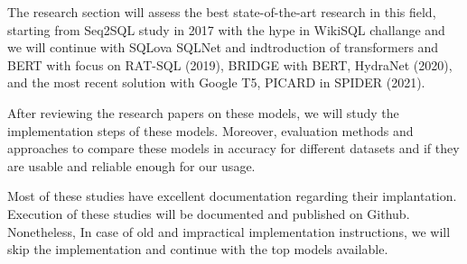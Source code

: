 The research section will assess the best state-of-the-art research in this field, starting from Seq2SQL\cite{zhong_seq2sql_2017} study in 2017 with the hype in WikiSQL challange and we will continue with SQLova\cite{hwang_comprehensive_2019} SQLNet\cite{xu_sqlnet_2017} and indtroduction of transformers and BERT with focus on RAT-SQL\cite{wang_rat-sql_2021} (2019), BRIDGE\cite{lin_bridging_2020} with BERT, HydraNet\cite{lyu_hybrid_2020} (2020), and the most recent solution with Google T5\cite{raffel_exploring_2020}, PICARD\cite{scholak_picard_2021} in SPIDER (2021).


After reviewing the research papers on these models, we will study the implementation steps of these models. Moreover, evaluation methods and approaches to compare these models in accuracy for different datasets and if they are usable and reliable enough for our usage.

Most of these studies have excellent documentation regarding their implantation. Execution of these studies will be documented and published on Github. Nonetheless, In case of old and impractical implementation instructions, we will skip the implementation and continue with the top models available.









